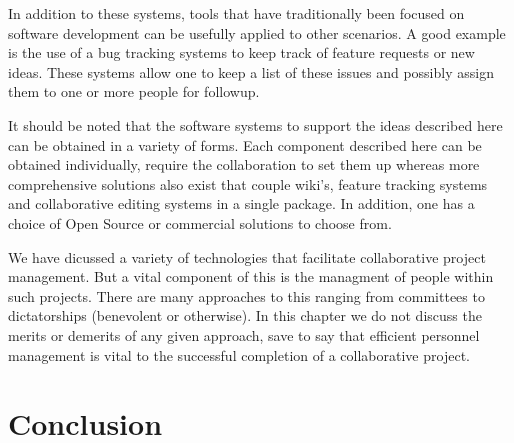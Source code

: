 \documentclass[12pt]{book}
\begin{document}
In addition to these systems, tools that have traditionally been
focused on software development can be usefully applied to other
scenarios. A good example is the use of a bug tracking systems to keep
track of feature requests or new ideas. These systems allow one to
keep a list of these issues and possibly assign them to one or more
people for followup.

It should be noted that the software systems to support the ideas
described here can be obtained in a variety of forms. Each component
described here can be obtained individually, require the collaboration
to set them up whereas more comprehensive solutions also exist that
couple wiki's, feature tracking systems and collaborative editing
systems in a single package. In addition, one has a choice of Open
Source or commercial solutions to choose from.

We have dicussed a variety of technologies that facilitate
collaborative project management. But a vital component of this is the
managment of people within such projects. There are many approaches to
this ranging from committees to dictatorships (benevolent or
otherwise). In this chapter we do not discuss the merits or demerits
of any given approach, save to say that efficient personnel management
is vital to the successful completion of a collaborative project.

\section{Conclusion}



\end{document}
